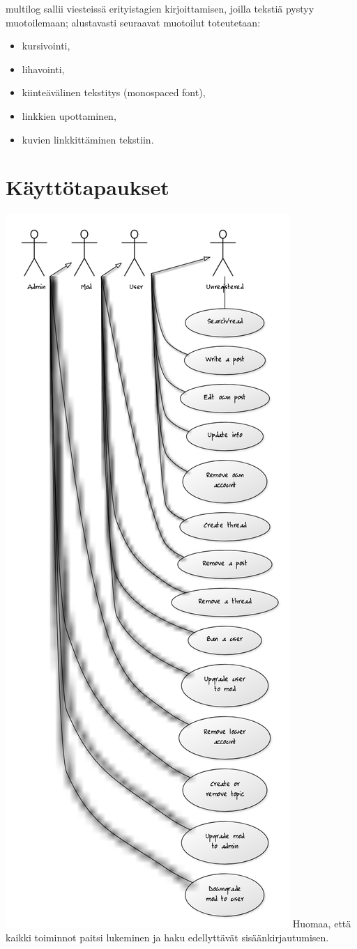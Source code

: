 \documentclass[10pt]{article}
\begin{document}
multilog sallii viesteissä erityistagien kirjoittamisen, joilla tekstiä pystyy muotoilemaan; alustavasti seuraavat muotoilut toteutetaan:
\begin{itemize}
  \item kursivointi,
  \item lihavointi,
  \item kiinteävälinen tekstitys (monospaced font),
  \item linkkien upottaminen,
  \item kuvien linkkittäminen tekstiin.
\end{itemize}

\section{Käyttötapaukset}
\includegraphics[width=\textwidth, height=\textheight, keepaspectratio]{multilog_use_case_diagram}
\newpage
\noindent Huomaa, että kaikki toiminnot paitsi lukeminen ja haku edellyttävät sisäänkirjautumisen.
\end{document}
